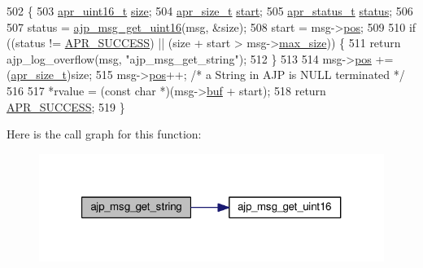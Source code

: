 \begin{DoxyCode}
502 \{
503     \hyperlink{group__apr__platform_ga3fb87c977e28a526d872d1081411b129}{apr\_uint16\_t} \hyperlink{group__APACHE__CORE__CONFIG_ga2bd3edb50f631a96f1b729fde236ff43}{size};
504     \hyperlink{group__apr__platform_gaaa72b2253f6f3032cefea5712a27540e}{apr\_size\_t}   \hyperlink{group__APACHE__CORE__DAEMON_ga6d3a995932cd00f6b3473898aa90d596}{start};
505     \hyperlink{group__apr__errno_gaa5105fa83cc322f09382292db8b47593}{apr\_status\_t} \hyperlink{group__APACHE__CORE__HTTPD_ga6e27f49150e9a14580fb313cc2777e00}{status};
506 
507     status = \hyperlink{group__AJP__api_gade25b6a051f93fb1d583d084318bf695}{ajp\_msg\_get\_uint16}(msg, &size);
508     start = msg->\hyperlink{structajp__msg_af2b6552360c32f52f84383d538d3df00}{pos};
509 
510     \textcolor{keywordflow}{if} ((status != \hyperlink{group__apr__errno_ga9ee311b7bf1c691dc521d721339ee2a6}{APR\_SUCCESS}) || (size + start > msg->\hyperlink{structajp__msg_a70f7c841e5b344fc94175a0ebcd7f062}{max\_size})) \{
511         \textcolor{keywordflow}{return} ajp\_log\_overflow(msg, \textcolor{stringliteral}{"ajp\_msg\_get\_string"});
512     \}
513 
514     msg->\hyperlink{structajp__msg_af2b6552360c32f52f84383d538d3df00}{pos} += (\hyperlink{group__apr__platform_gaaa72b2253f6f3032cefea5712a27540e}{apr\_size\_t})size;
515     msg->\hyperlink{structajp__msg_af2b6552360c32f52f84383d538d3df00}{pos}++;                   \textcolor{comment}{/* a String in AJP is NULL terminated */}
516 
517     *rvalue = (\textcolor{keyword}{const} \textcolor{keywordtype}{char} *)(msg->\hyperlink{structajp__msg_a7343b1803e9177dccb3c4716a5e12c3a}{buf} + start);
518     \textcolor{keywordflow}{return} \hyperlink{group__apr__errno_ga9ee311b7bf1c691dc521d721339ee2a6}{APR\_SUCCESS};
519 \}
\end{DoxyCode}


Here is the call graph for this function\+:
\nopagebreak
\begin{figure}[H]
\begin{center}
\leavevmode
\includegraphics[width=321pt]{group__AJP__api_ga830e4e092229a2fd4e7d1b97761c02d9_cgraph}
\end{center}
\end{figure}



